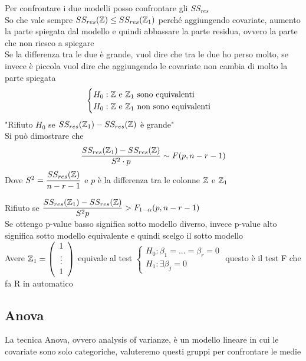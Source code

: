 Per confrontare i due modelli posso confrontare gli $SS_{res}$\\
So che vale sempre $SS_{res}(\mathbb Z) \le SS_{res}(\mathbb Z_1)$ perché aggiungendo covariate, aumento la parte spiegata dal modello e quindi abbassare la parte residua, ovvero la parte che non riesco a spiegare\\
Se la differenza tra le due è grande, vuol dire che tra le due ho perso molto, se invece è piccola vuol dire che aggiungendo le covariate non cambia di molto la parte spiegata
\[
\begin{cases}
    H_0: \mathbb Z \text{ e } \mathbb Z_1 \text{ sono equivalenti}\\
    H_0: \mathbb Z \text{ e } \mathbb Z_1 \text{ non sono equivalenti}
\end{cases}
\]
"Rifiuto $H_0$ se $SS_{res}(\mathbb Z_1) - SS_{res}(\mathbb Z)$ è grande"\\

Si può dimostrare che
\[
\dfrac{SS_{res}(\mathbb Z_1)-SS_{res}(\mathbb Z)}{S^2\cdot p} \sim F(p, n-r-1)
\]
Dove  $S^2= \dfrac{SS_{res}(\mathbb Z)}{n-r-1}$ e $p$ è la differenza tra le colonne $\mathbb Z$ e $\mathbb Z_1$\skipp

Rifiuto se $\dfrac{SS_{res}(\mathbb Z_1)-SS_{res}(\mathbb Z)}{S^2p}> F_{1-\alpha}(p,n-r-1)$\skipp\\
Se ottengo p-value basso significa sotto modello diverso, invece p-value alto significa sotto modello equivalente e quindi scelgo il sotto modello\\

Avere $\mathbb Z_1=\left(\begin{array}{c}
     1  \\
     \vdots\\
     1
\end{array}\right)$ equivale al test $\begin{cases}
    H_0: \beta_1 = ... = \beta_r =0\\
    H_1 : \exists \beta_j =0
\end{cases}$ questo è il test F che fa R in automatico\\


\subsection{Anova}
La tecnica Anova, ovvero analysis of varianze, è un modello lineare in cui le covariate sono solo categoriche, valuteremo questi gruppi per confrontare le medie\\

